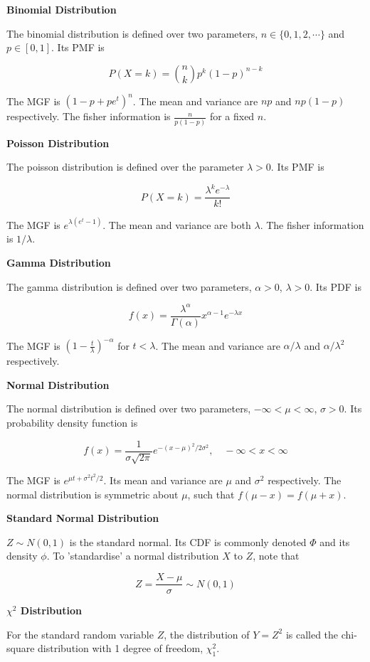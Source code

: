 \documentclass[a4paper]{article}
\newcommand{\subheading}[1]{{\scriptsize\textbf{#1}}}
\begin{document}
\begin{multicols*}{4}
\subheading{Binomial Distribution}

The binomial distribution is defined over two parameters, $n \in \{0, 1, 2,
\cdots\}$ and $p \in [0, 1]$. Its PMF is

$$P(X=k) = \binom{n}{k}p^k(1-p)^{n-k}$$

The MGF is $(1-p+pe^t)^n$. The mean and variance are $np$ and $np(1-p)$
respectively. The fisher information is $\frac{n}{p(1-p)}$ for a fixed $n$.
\smallskip

\subheading{Poisson Distribution}

The poisson distribution is defined over the parameter $\lambda >0$. Its PMF is

$$P(X=k) = \frac{\lambda^k e^{-\lambda}}{k!}$$

The MGF is $e^{\lambda(e^t - 1)}$. The mean and variance are both $\lambda$. The
fisher information is $1/\lambda$. \smallskip

\subheading{Gamma Distribution}

The gamma distribution is defined over two parameters, $\alpha > 0$, $\lambda >
0$. Its PDF is

$$f(x) = \frac{\lambda^\alpha}{\Gamma(\alpha)} x^{\alpha-1} e^{-\lambda x}$$

The MGF is $\left ( 1 - \frac{t}{\lambda} \right )^{-\alpha}$ for $t < \lambda$.
The mean and variance are $\alpha / \lambda$ and $\alpha / \lambda^2$
respectively. \smallskip

\subheading{Normal Distribution}

The normal distribution is defined over two parameters, $-\infty < \mu <
\infty$, $\sigma > 0$. Its probability density function is

$$f(x) = \frac{1}{\sigma\sqrt{2\pi}} e^{-(x-\mu)^2 / 2\sigma^2},
  \quad -\infty < x < \infty$$

The MGF is $e^{\mu t + \sigma^2 t^2 / 2}$. Its mean and variance are $\mu$ and
$\sigma^2$ respectively. The normal distribution is symmetric about $\mu$, such
that $f(\mu - x) = f(\mu + x)$. \smallskip

\subheading{Standard Normal Distribution}

$Z \sim N(0, 1)$ is the standard normal. Its CDF is commonly denoted $\Phi$ and
its density $\phi$. To 'standardise' a normal distribution $X$ to $Z$, note that

$$Z = \frac{X - \mu}{\sigma} \sim N(0, 1)$$

\subheading{$\chi^2$ Distribution}

For the standard random variable $Z$, the distribution of $Y = Z^2$ is called
the chi-square distribution with 1 degree of freedom, $\chi^2_1$. \smallskip


\end{multicols*}
\end{document}
